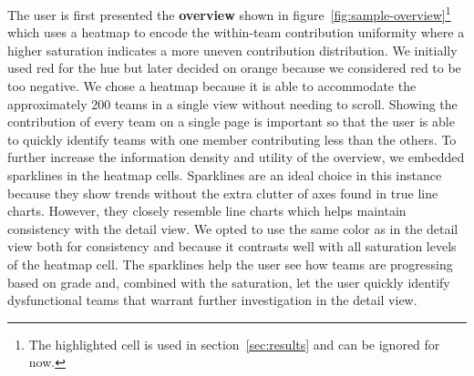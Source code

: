 \documentclass[../manifest.tex]{subfiles}
\begin{document}
The user is first presented the \textbf{overview} shown in figure~\ref{fig:sample-overview}\footnote{The highlighted cell is used in section~\ref{sec:results} and can be ignored for now.} which uses a heatmap to encode the within-team contribution uniformity where a higher saturation indicates a more uneven contribution distribution. We initially used red for the hue but later decided on orange because we considered red to be too negative. We chose a heatmap because it is able to accommodate the approximately 200 teams in a single view without needing to scroll. Showing the contribution of every team on a single page is important so that the user is able to quickly identify teams with one member contributing less than the others. To further increase the information density and utility of the overview, we embedded sparklines in the heatmap cells. Sparklines are an ideal choice in this instance because they show trends without the extra clutter of axes found in true line charts. However, they closely resemble line charts which helps maintain consistency with the detail view. We opted to use the same color as in the detail view both for consistency and because it contrasts well with all saturation levels of the heatmap cell. The sparklines help the user see how teams are progressing based on grade and, combined with the saturation, let the user quickly identify dysfunctional teams that warrant further investigation in the detail view.


\end{document}
